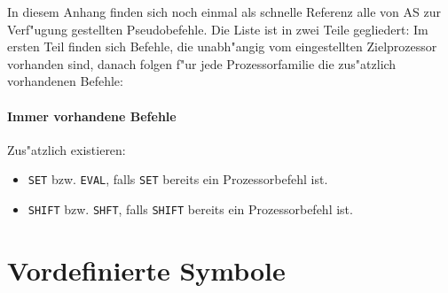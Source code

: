 \documentclass[12pt,a4paper,twoside]{report}
\newcommand{\tty}[1]{{\tt #1}}
\begin{document}
In diesem Anhang finden sich noch einmal als schnelle Referenz alle
von AS zur Verf"ugung gestellten Pseudobefehle.  Die Liste ist in zwei
Teile gegliedert: Im ersten Teil finden sich Befehle, die unabh"angig
vom eingestellten Zielprozessor vorhanden sind, danach folgen f"ur
jede Prozessorfamilie die zus"atzlich vorhandenen Befehle:

\subsubsection{Immer vorhandene Befehle}

Zus"atzlich existieren:
\begin{itemize}
\item{\tty{SET} bzw. \tty{EVAL}, falls \tty{SET} bereits ein Prozessorbefehl
      ist.}
\item{\tty{SHIFT} bzw. \tty{SHFT}, falls \tty{SHIFT} bereits ein Prozessorbefehl
      ist.}
\end{itemize}




\cleardoublepage
\chapter{Vordefinierte Symbole}\label{AppInternSyms}
\end{document}

